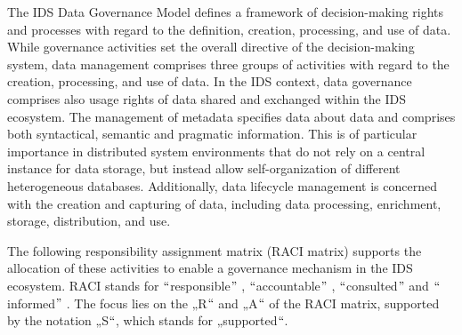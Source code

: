 The IDS Data Governance Model defines a framework of decision-making rights and processes with regard to the definition, creation, processing, and use of data. While governance activities set the overall directive of the decision-making system, data management comprises three groups of activities with regard to the creation, processing, and use of data. In the IDS context, data governance comprises also usage rights of data shared and exchanged within the IDS ecosystem. The management of metadata specifies data about data and comprises both syntactical, semantic and pragmatic information. This is of particular importance in distributed system environments that do not rely on a central instance for data storage, but instead allow self-organization of different heterogeneous databases. Additionally, data lifecycle management is concerned with the creation and capturing of data, including data processing, enrichment, storage, distribution, and use.

The following responsibility assignment matrix (RACI matrix) supports the allocation of these activities to enable a governance mechanism in the IDS ecosystem. RACI stands for $``$responsible$"$ , $``$accountable$"$ , $``$consulted$"$  and $``$informed$"$ . The focus lies on the „R$``$ and „A$``$ of the RACI matrix, supported by the notation „S$``$, which stands for „supported$``$. 




